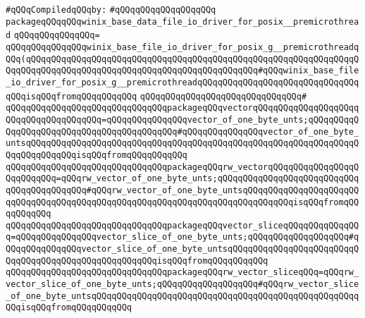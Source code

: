 \newline
\verb|#qQQqCompiledqQQqby:|\newline
\verb|#qQQqqQQqqQQqqQQqqQQq|\newline
\newline
\newline
\verb|packageqQQqqQQqwinix_base_data_file_io_driver_for_posix__premicrothread|\newline
\verb|qQQqqQQqqQQqqQQq=|\newline
\verb|qQQqqQQqqQQqqQQqwinix_base_file_io_driver_for_posix_g__premicrothreadqQQq(qQQqqQQqqQQqqQQqqQQqqQQqqQQqqQQqqQQqqQQqqQQqqQQqqQQqqQQqqQQqqQQqqQQqqQQqqQQqqQQqqQQqqQQqqQQqqQQqqQQqqQQqqQQqqQQqqQQq#qQQqwinix_base_file_io_driver_for_posix_g__premicrothreadqQQqqQQqqQQqqQQqqQQqqQQqqQQqqQQqqQQqisqQQqfromqQQqqQQqqQQq|\newline
\verb|qQQqqQQqqQQqqQQqqQQqqQQqqQQqqQQq#|\newline
\verb|qQQqqQQqqQQqqQQqqQQqqQQqqQQqqQQqpackageqQQqvectorqQQqqQQqqQQqqQQqqQQqqQQqqQQqqQQqqQQqqQQq=qQQqqQQqqQQqqQQqvector_of_one_byte_unts;qQQqqQQqqQQqqQQqqQQqqQQqqQQqqQQqqQQqqQQqqQQq#qQQqqQQqqQQqqQQqvector_of_one_byte_untsqQQqqQQqqQQqqQQqqQQqqQQqqQQqqQQqqQQqqQQqqQQqqQQqqQQqqQQqqQQqqQQqqQQqqQQqqQQqqQQqisqQQqfromqQQqqQQqqQQq|\newline
\verb|qQQqqQQqqQQqqQQqqQQqqQQqqQQqqQQqpackageqQQqrw_vectorqQQqqQQqqQQqqQQqqQQqqQQqqQQq=qQQqrw_vector_of_one_byte_unts;qQQqqQQqqQQqqQQqqQQqqQQqqQQqqQQqqQQqqQQqqQQq#qQQqrw_vector_of_one_byte_untsqQQqqQQqqQQqqQQqqQQqqQQqqQQqqQQqqQQqqQQqqQQqqQQqqQQqqQQqqQQqqQQqqQQqqQQqqQQqqQQqisqQQqfromqQQqqQQqqQQq|\newline
\verb|qQQqqQQqqQQqqQQqqQQqqQQqqQQqqQQqpackageqQQqvector_sliceqQQqqQQqqQQqqQQq=qQQqqQQqqQQqqQQqvector_slice_of_one_byte_unts;qQQqqQQqqQQqqQQqqQQq#qQQqqQQqqQQqqQQqvector_slice_of_one_byte_untsqQQqqQQqqQQqqQQqqQQqqQQqqQQqqQQqqQQqqQQqqQQqqQQqqQQqqQQqisqQQqfromqQQqqQQqqQQq|\newline
\verb|qQQqqQQqqQQqqQQqqQQqqQQqqQQqqQQqpackageqQQqrw_vector_sliceqQQq=qQQqrw_vector_slice_of_one_byte_unts;qQQqqQQqqQQqqQQqqQQq#qQQqrw_vector_slice_of_one_byte_untsqQQqqQQqqQQqqQQqqQQqqQQqqQQqqQQqqQQqqQQqqQQqqQQqqQQqqQQqisqQQqfromqQQqqQQqqQQq|\newline
